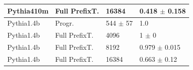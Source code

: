 \begin{tabular}{llll}
 Pythia410m          & Full PrefixT. & 16384                   & 0.418 {\small $\pm$ 0.158} \\
 \midrule
 Pythia1.4b          & Progr.        & 544 {\small $\pm$ 57}   & 1.0                        \\
 Pythia1.4b          & Full PrefixT. & 4096                    & 1 {\small $\pm$ 0}         \\
 Pythia1.4b          & Full PrefixT. & 8192                    & 0.979 {\small $\pm$ 0.015} \\
 Pythia1.4b          & Full PrefixT. & 16384                   & 0.663 {\small $\pm$ 0.12}  \\
\bottomrule
\end{tabular}
